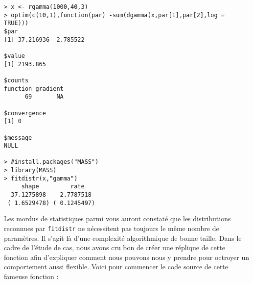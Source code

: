 \begin{lstlisting}[caption = Ajustement de distribution sur données empiriques,label=src:fitdistr]
> x <- rgamma(1000,40,3)
> optim(c(10,1),function(par) -sum(dgamma(x,par[1],par[2],log = TRUE)))
$par
[1] 37.216936  2.785522

$value
[1] 2193.865

$counts
function gradient 
      69       NA 

$convergence
[1] 0

$message
NULL

> #install.packages("MASS")
> library(MASS)
> fitdistr(x,"gamma")
     shape         rate   
  37.1275898    2.7787518 
 ( 1.6529478) ( 0.1245497)
\end{lstlisting}

Les mordus de statistiques parmi vous auront constaté que les distributions reconnues par \texttt{fitdistr} ne nécessitent pas toujours le même nombre de paramètres. Il s'agit là d'une complexité algorithmique de bonne taille. Dans le cadre de l'étude de cas, nous avons cru bon de créer une réplique de cette fonction afin d'expliquer comment nous pouvons nous y prendre pour octroyer un comportement aussi flexible. Voici pour commencer le code source de cette fameuse fonction : \\

